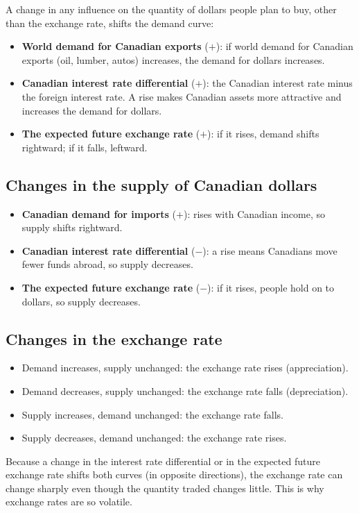 A change in any influence on the quantity of dollars people plan to buy, other than the
exchange rate, shifts the demand curve:
\begin{itemize}
  \item \textbf{World demand for Canadian exports} ($+$): if world demand for Canadian
        exports (oil, lumber, autos) increases, the demand for dollars increases.
  \item \textbf{Canadian interest rate differential} ($+$): the Canadian interest rate
        minus the foreign interest rate. A rise makes Canadian assets more attractive and
        increases the demand for dollars.
  \item \textbf{The expected future exchange rate} ($+$): if it rises, demand shifts
        rightward; if it falls, leftward.
\end{itemize}

\subsection{Changes in the supply of Canadian dollars}

\begin{itemize}
  \item \textbf{Canadian demand for imports} ($+$): rises with Canadian income, so supply
        shifts rightward.
  \item \textbf{Canadian interest rate differential} ($-$): a rise means Canadians move
        fewer funds abroad, so supply decreases.
  \item \textbf{The expected future exchange rate} ($-$): if it rises, people hold on to
        dollars, so supply decreases.
\end{itemize}

\subsection{Changes in the exchange rate}

\begin{itemize}
  \item Demand increases, supply unchanged: the exchange rate rises (appreciation).
  \item Demand decreases, supply unchanged: the exchange rate falls (depreciation).
  \item Supply increases, demand unchanged: the exchange rate falls.
  \item Supply decreases, demand unchanged: the exchange rate rises.
\end{itemize}
Because a change in the interest rate differential or in the expected future exchange rate
shifts both curves (in opposite directions), the exchange rate can change sharply even
though the quantity traded changes little. This is why exchange rates are so volatile.

